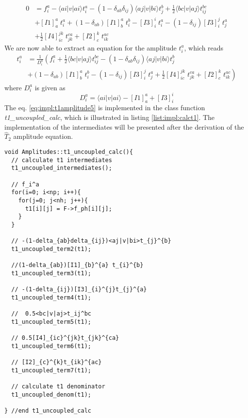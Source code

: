 \begin{align}
0&=f_i^a - \langle ai|v|ai \rangle t_{i}^{a}-(1-\delta_{ab}\delta_{ij})\langle aj|v|bi \rangle t_{j}^{b}+\frac{1}{2}\langle bc|v|aj\rangle t_{ij}^{bc}\nonumber\\
&+[I1]_a^a\phantom{.}t_i^a+(1-\delta_{ab})[I1]_b^a\phantom{.}t_i^b-[I3]_i^i\phantom{.}t_{i}^{a}-(1-\delta_{ij})[I3]_i^j\phantom{.}t_{j}^{a}\nonumber\\
&+\frac{1}{2}[I4]_{ic}^{jk}\phantom{.}t_{jk}^{ca}+[I2]_c^k\phantom{.}t_{ik}^{ac}
\label{eq:impl:t1amplitude4}
\end{align}
We are now able to extract an equation for the amplitude $t_i^a$, which reads
\begin{align}
t_i^a&=\frac{1}{D_i^a}\left(f_i^a+\frac{1}{2}\langle bc|v|aj\rangle t_{ij}^{bc}-(1-\delta_{ab}\delta_{ij})\langle aj|v|bi \rangle t_{j}^{b}\right.\nonumber\\
&\left. +(1-\delta_{ab})[I1]_b^a\phantom{.}t_i^b-(1-\delta_{ij})[I3]_i^j\phantom{.}t_{j}^{a}+\frac{1}{2}[I4]_{ic}^{jk}\phantom{.}t_{jk}^{ca}+[I2]_c^k\phantom{.}t_{ik}^{ac}\right)
\label{eq:impl:t1amplitude5}
\end{align} 
where $D_i^a$ is given as
\begin{equation}
D_i^a= \langle ai|v|ai \rangle-[I1]_a^a+[I3]_i^i
\label{eq:impl:t1denom}
\end{equation}
The eq. \ref{eq:impl:t1amplitude5} is implemented in the class function \emph{t1\_uncoupled\_calc}, which is illustrated in listing \ref{list:impl:calct1}. The implementation of the intermediates will be presented after the derivation of the $\hat{T}_2$ amplitude equation.
%
\begin{lstlisting}[label={list:impl:calct1},caption={Implementation of the amp1 class function t1\_uncoupled\_calc()}]
void Amplitudes::t1_uncoupled_calc(){
  // calculate t1 intermediates
  t1_uncoupled_intermediates();
  
  // f_i^a
  for(i=0; i<np; i++){
    for(j=0; j<nh; j++){
      t1[i][j] = F->f_ph[i][j];
    }
  }

  // -(1-delta_{ab}delta_{ij})<aj|v|bi>t_{j}^{b}
  t1_uncoupled_term2(t1);

  //(1-delta_{ab})[I1]_{b}^{a} t_{i}^{b}
  t1_uncoupled_term3(t1);
  
  // -(1-delta_{ij})[I3]_{i}^{j}t_{j}^{a}
  t1_uncoupled_term4(t1);

  //  0.5<bc|v|aj>t_ij^bc
  t1_uncoupled_term5(t1);

  // 0.5[I4]_{ic}^{jk}t_{jk}^{ca}
  t1_uncoupled_term6(t1);

  // [I2]_{c}^{k}t_{ik}^{ac}
  t1_uncoupled_term7(t1);

  // calculate t1 denominator
  t1_uncoupled_denom(t1);
  
} //end t1_uncoupled_calc
\end{lstlisting}
